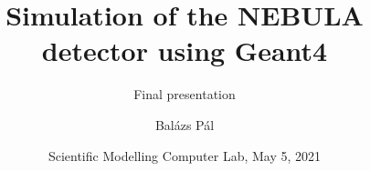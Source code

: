 \title[Geant4]
{Simulation of the NEBULA detector using Geant4}

\subtitle{Final presentation}

\author[Balázs Pál]
{Balázs Pál}


\date[ELTE 2021]
{Scientific Modelling Computer Lab, May 5, 2021}


